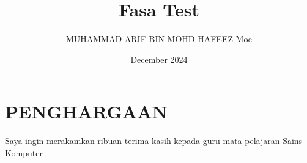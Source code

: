 \documentclass[a4paper, 12pt]{article}
\title{Fasa Test}
\author{MUHAMMAD ARIF BIN MOHD HAFEEZ Moe}
\date{December 2024}
\begin{document}
\section*{PENGHARGAAN}

\begin{center}
    Saya ingin merakamkan ribuan terima kasih kepada guru mata pelajaran Sains Komputer 
\end{center}

\newpage
\tableofcontents




\end{document}
